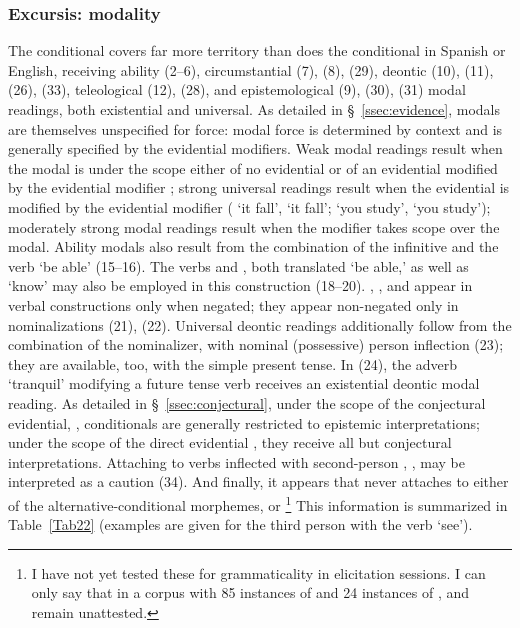 \subsubsection{Excursis: modality}\label{ssec:modality}
The \SYQ{} conditional covers far more territory than does the conditional in Spanish or English, receiving ability (2--6), circumstantial (7), (8), (29), deontic (10), (11), (26), (33), teleological (12), (28), and epistemological (9), (30), (31) modal readings, both existential and universal. As detailed in \S~\ref{ssec:evidence}, \SYQ{} modals are themselves unspecified for force: modal force is determined by context and is generally specified by the evidential modifiers. Weak modal readings result when the modal is under the scope either of no evidential or of an evidential modified by the evidential modifier \uo{}; strong universal readings result when the evidential is modified by the evidential modifier  ( `it  fall',  `it  fall';  `you  study',  `you  study'); moderately strong modal readings result when the modifier  takes scope over the modal. Ability modals also result from the combination of the infinitive and the verb  `be able' (15--16). The verbs  and , both translated `be able,' as well as  `know' may also be employed in this construction (18--20). , , and  appear in verbal constructions only when negated; they appear non-negated only in nominalizations (21), (22). Universal deontic readings additionally follow from the combination of the nominalizer,  with nominal (possessive) person inflection (23); they are available, too, with the simple present tense. In (24), the adverb  `tranquil' modifying a future tense verb receives an existential deontic modal reading. As detailed in \S~\ref{ssec:conjectural}, under the scope of the conjectural evidential, , conditionals are generally restricted to epistemic interpretations; under the scope of the direct evidential , they receive all but conjectural interpretations. Attaching to verbs inflected with second-person , , may be interpreted as a caution (34). And finally, it appears that  never attaches to either of the alternative-conditional morphemes,  or \footnote{I have not yet tested these for grammaticality in elicitation sessions. I can only say that in a corpus with 85 instances of  and 24 instances of ,  and  remain unattested.} This information is summarized in Table~\ref{Tab22} (examples are given for the third person with the verb  `see').

